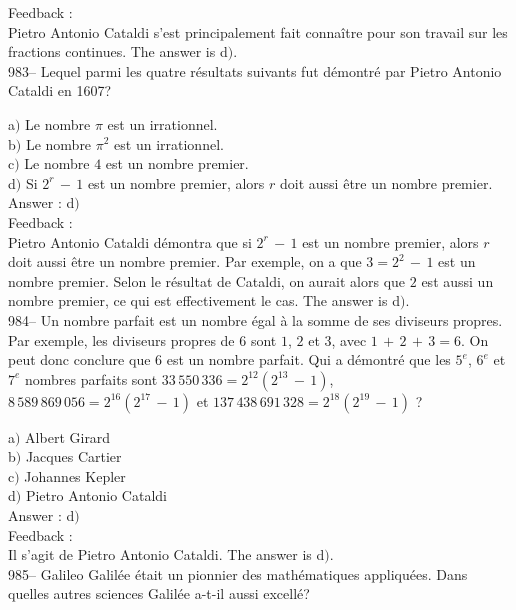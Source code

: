 \documentclass[letterpaper, 12pt]{article}
\begin{document}
Feedback : \\
Pietro Antonio Cataldi s'est principalement fait conna\^itre pour son
travail sur les fractions continues. The answer is d$)$.\\

983-- Lequel parmi les quatre r\'esultats suivants fut d\'emontr\'e
par Pietro Antonio Cataldi en 1607?

a$)$ Le nombre $\pi$ est un irrationnel. \\
b$)$ Le nombre $\pi^2$ est un irrationnel. \\
c$)$ Le nombre $4$ est un nombre premier. \\
d$)$ Si $2^r\,-\,1$ est un nombre premier, alors $r$ doit aussi \^etre un
nombre premier.\\

Answer : d$)$\\

Feedback : \\
Pietro Antonio Cataldi d\'emontra que si $2^r\,-\,1$ est un nombre
premier, alors $r$ doit aussi \^etre un nombre premier. Par exemple,
on a que $3=2^2\,-\,1$ est un nombre premier. Selon le r\'esultat de
Cataldi, on aurait alors que $2$ est aussi un nombre premier, ce qui
est effectivement le cas.
The answer is d$)$.\\

984-- Un nombre parfait est un nombre \'egal \`a la somme de ses
diviseurs propres. Par exemple, les diviseurs propres de $6$ sont
$1$, $2$ et $3$, avec $1\,+\,2\,+\,3=6$. On peut donc conclure que
$6$ est un nombre parfait. Qui a d\'emontr\'e que les $5^e$, $6^e$
et $7^e$ nombres parfaits sont $33\,550\,336=2^{12}(2^{13}\,-\,1)$,
$8\,589\,869\,056=2^{16}(2^{17}\,-\,1)$ et
$137\,438\,691\,328=2^{18}(2^{19}\,-\,1)$ ?

a$)$ Albert Girard\\
b$)$ Jacques Cartier \\
c$)$ Johannes Kepler \\
d$)$ Pietro Antonio Cataldi\\

Answer : d$)$\\

Feedback : \\
Il s'agit de Pietro Antonio Cataldi. The answer is d$)$.\\

985-- Galileo Galil\'ee \'etait un pionnier des math\'ematiques
appliqu\'ees. Dans quelles autres sciences Galil\'ee a-t-il aussi
excell\'e?
\end{document}

